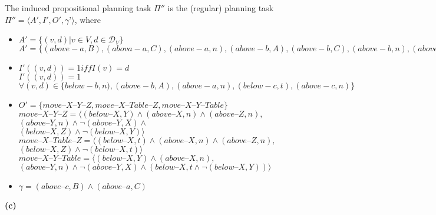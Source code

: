 \documentclass[11pt,a4paper]{article}
\newcommand{\h}[0]{\text{--}}
\begin{document}
The induced propositional planning task $\Pi''$ is the (regular) planning task $\Pi'' = \langle A',I', O', \gamma’\rangle$, where
\begin{itemize}
\item $A' = \{(v,d) | v \in V, d \in \mathscr{D}_V\}$\\
$A'= \{(above-a, B), (abova-a, C), (above-a, n), (above-b, A), (above-b, C), (above-b, n), (above-c, A), (above-c, B), (above-c, n), (below-a, B), (below-a, C), (below-a, t), (below-b, A), (below-b, C), (below-b, t), (below-c, A), (below-c, B), (below-c, t) \}$

\item $I'((v,d)) = 1 iff I(v) = d$\\
$I'((v,d)) = 1$ $\forall (v,d) \in \{below-b, n), (above-b, A), (above-a, n), (below-c, t), (above-c, n)\}$

\item
$O'=\{move\h X\h Y\h Z,move\h X\h Table\h Z,move\h X\h Y\h Table\}$\\
$move\h X\h Y\h Z=\langle (below\h X, Y) \land (above\h X, n) \land (above\h Z, n),$\\
\hphantom{wwww}$(above\h Y, n) \land \lnot(above\h Y, X) \land $\\
\hphantom{wwww}$(below\h X, Z) \land \lnot(below\h X, Y) \rangle$
\\
$move\h X\h Table\h Z=\langle(below\h X, t) \land (above\h X, n) \land (above\h Z, n),$\\
\hphantom{wwww}$(below\h X, Z) \land \lnot(below\h X, t)\rangle$
\\
$move\h X\h Y\h Table=\langle(below\h X, Y) \land (above\h X, n),$\\
\hphantom{wwww}$(above\h Y, n) \land \lnot(above\h Y, X) \land (below\h X, t \land \lnot(below\h X, Y))\rangle$\\



\item $\gamma=(above\h c, B)\land(above\h a, C)$
\end{itemize}
\textbf{(c)}
\newpage
\end{document}
